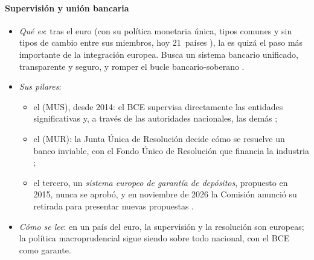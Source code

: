 \documentclass[11pt]{article}
\begin{document}
\paragraph{Supervisión y unión bancaria}
\begin{itemize}
\item \emph{Qué es}: tras el euro (con su política monetaria única, tipos comunes y sin tipos de cambio entre sus miembros, hoy 21~países \parencite{BCE2026Bulgaria}), la  es quizá el paso más importante de la integración europea. Busca un sistema bancario unificado, transparente y seguro, y romper el bucle bancario-soberano .
\item \emph{Sus pilares}:
  \begin{itemize}
  \item el  (MUS), desde 2014: el BCE supervisa directamente las entidades significativas y, a través de las autoridades nacionales, las demás \parencite{RegUE2013MUS};
  \item el  (MUR): la Junta Única de Resolución decide cómo se resuelve un banco inviable, con el Fondo Único de Resolución que financia la industria \parencite{RegUE2014MUR};
  \item el tercero, un \emph{sistema europeo de garantía de depósitos}, propuesto en 2015, nunca se aprobó, y en noviembre de 2026 la Comisión anunció su retirada para presentar nuevas propuestas \parencite{CE2015EDIS}.
  \end{itemize}
\item \emph{Cómo se lee}: en un país del euro, la supervisión y la resolución son europeas; la política macroprudencial sigue siendo sobre todo nacional, con el BCE como garante.
\end{itemize}
\end{document}
